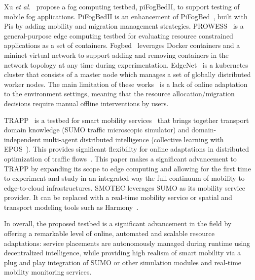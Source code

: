 \documentclass[conference]{IEEEtran}
\begin{document}
\par Xu \textit{et al.}~\cite{xu2020support} propose a fog computing testbed, piFogBedII, to support testing of mobile fog applications. PiFogBedII is an enhancement of PiFogBed~\cite{xu2019pifogbed}, built with Pis by adding mobility and migration management strategies. PROWESS~\cite{boubin2022prowess} is a general-purpose edge computing testbed for evaluating resource constrained applications as a set of containers. Fogbed~\cite{coutinho2018fogbed} leverages Docker containers and a mininet virtual network to support adding and removing containers in the network topology at any time during experimentation. EdgeNet~\cite{cappos2018edgenet} is a kubernetes cluster that consists of a master node which manages a set of globally distributed worker nodes. 
The main limitation of these works~\cite{coutinho2018fogbed,cappos2018edgenet,rimal2018experimental,xu2020support,xu2019pifogbed,boubin2022prowess} is a lack of online adaptation to the environment settings, meaning that the resource allocation/migration decisions require manual offline interventions by users.

\par TRAPP~\cite{Gerostathopoulos2019} is a testbed for smart mobility services~\cite{Davis2021} that brings together transport domain knowledge (SUMO traffic microscopic simulator) and domain-independent multi-agent distributed intelligence (collective learning with EPOS~\cite{pournaras2018decentralized,pournaras2020collective}). This provides significant flexibility for online adaptations in distributed optimization of traffic flows~\cite{Davis2021}. This paper makes a significant advancement to TRAPP by expanding its scope to edge computing and allowing for the first time to experiment and study in an integrated way the full continuum of mobility-to-edge-to-cloud infrastructures. SMOTEC leverages SUMO as its mobility service provider. It can be replaced with a real-time mobility service or spatial and transport modeling tools such as Harmony~\cite{yfantis2021software}.

\par In overall, the proposed testbed is a significant advancement in the field by offering a remarkable level of online, automated and scalable resource adaptations: service placements are autonomously managed during runtime using decentralized intelligence, while providing high realism of smart mobility via a plug and play integration of SUMO or other simulation modules and real-time mobility monitoring services. 
\end{document}
